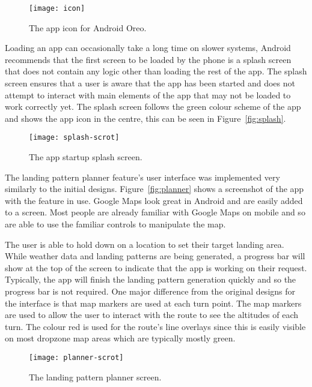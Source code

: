 \begin{wrapfigure}{l}{0.25\textwidth}
  \centering
  \texttt{[image: icon]}
  \caption{The app icon for Android Oreo.}\label{fig:icon}
\end{wrapfigure}

Loading an app can occasionally take a long time on slower systems, Android recommends that the first screen to be loaded by the phone is a splash screen that does not contain any logic other than loading the rest of the app. The splash screen ensures that a user is aware that the app has been started and does not attempt to interact with main elements of the app that may not be loaded to work correctly yet. The splash screen follows the green colour scheme of the app and shows the app icon in the centre, this can be seen in Figure~\vref{fig:splash}.

\begin{wrapfigure}[21]{l}{0.3\textwidth}
  \centering
  \texttt{[image: splash-scrot]}
  \caption{The app startup splash screen.}\label{fig:splash}
\end{wrapfigure}

The landing pattern planner feature's user interface was implemented very similarly to the initial designs. Figure~\vref{fig:planner} shows a screenshot of the app with the feature in use. Google Maps look great in Android and are easily added to a screen. Most people are already familiar with Google Maps on mobile and so are able to use the familiar controls to manipulate the map.

The user is able to hold down on a location to set their target landing area. While weather data and landing patterns are being generated, a progress bar will show at the top of the screen to indicate that the app is working on their request. Typically, the app will finish the landing pattern generation quickly and so the progress bar is not required. One major difference from the original designs for the interface is that map markers are used at each turn point. The map markers are used to allow the user to interact with the route to see the altitudes of each turn. The colour red is used for the route's line overlays since this is easily visible on most dropzone map areas which are typically mostly green.

\begin{wrapfigure}{L}{0.3\textwidth}
  \centering
  \texttt{[image: planner-scrot]}
  \caption{The landing pattern planner screen.}\label{fig:planner}
\end{wrapfigure}


